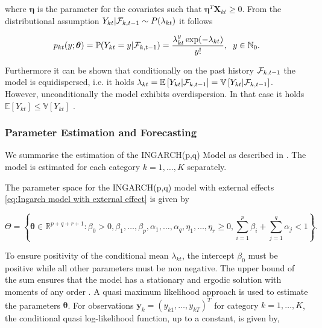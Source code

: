 where $\bm{\eta}$ is the parameter for the covariates such that $\bm{\eta}^T\textbf{X}_{kt} \geq 0$.
From the distributional assumption $Y_{kt} | \mathcal{F}_{k,t-1} \sim P(\lambda_{kt})$ it follows

\begin{equation}
p_{kt}(y;\bm{\theta})=\mathbb{P}(Y_{kt}=y | \mathcal{F}_{k,t-1}) = \frac{\lambda_{kt}^y \exp(-\lambda_{kt})}{y!}, \hspace{0.2cm} y \in \mathbb{N}_0.
\label{eq:Ingarch Distribution}
\end{equation}

Furthermore it can be shown that conditionally on the past history $\mathcal{F}_{k,t-1}$ the model is equidispersed, i.e. it holds $\lambda_{kt} = \mathbb{E}\left[Y_{kt} | \mathcal{F}_{k,t-1}\right] = \mathbb{V}\left[Y_{kt} | \mathcal{F}_{k,t-1}\right]$. However, unconditionally the model exhibits overdispersion. In that case it holds $\mathbb{E}\left[Y_{kt}\right] \leq \mathbb{V}\left[Y_{kt}\right] $ \cite{Heinen:2003}. 

\subsubsection{Parameter Estimation and Forecasting}
\label{sec: Estimation of the Ingarch Model}

We summarise the estimation of the INGARCH(p,q) Model as described in \cite{Liboschik:2016}. The model is estimated for each category $k=1,\ldots,K$ separately. 

The parameter space for the INGARCH(p,q) model with external effects \ref{eq:Ingarch model with external effect} is given by 

\begin{equation}
\Theta = \left\{ \bm{\theta} \in \mathbb{R}^{p+q+r+1}: \beta_0 > 0, \beta_1,\ldots,\beta_p,\alpha_1,\ldots,\alpha_q,\eta_1,\ldots,\eta_r \geq 0, \sum_{i=1}^p\beta_i + \sum_{j=1}^q\alpha_j < 1 \right\}.
\label{eq:Ingarch parameter space}
\end{equation}

To ensure positivity of the conditional mean $\lambda_{kt}$, the intercept $\beta_0$ must be positive while all other parameters must be non negative. The upper bound of the sum ensures that the model has a stationary and ergodic solution with moments of any order \cite{Ferland:2006,Fokianos:2009,Doukhan:2012}. A quasi maximum likelihood approach is used to estimate the parameters $\bm{\theta}$. 
For observations $\textbf{y}_k = \left(y_{k1},\ldots,y_{kT}\right)^T$ for category $k=1,\ldots,K$, the conditional quasi log-likelihood function, up to a constant, is given by,

